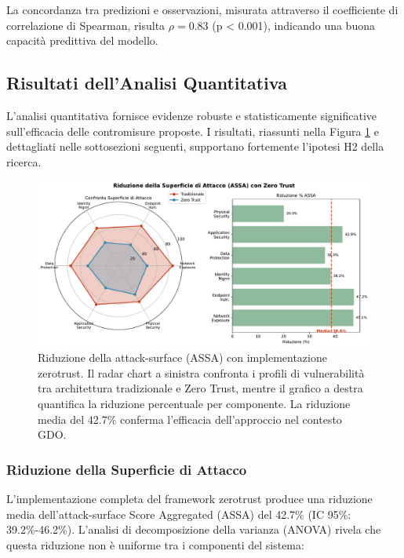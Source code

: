 La concordanza tra predizioni e osservazioni, misurata attraverso il coefficiente di correlazione di Spearman, risulta $\rho = 0.83$ (p < 0.001), indicando una buona capacità predittiva del modello.

\subsection{\texorpdfstring{Risultati dell'Analisi Quantitativa}{2.5.2 - Risultati dell'Analisi Quantitativa}}

L'analisi quantitativa fornisce evidenze robuste e statisticamente significative sull'efficacia delle contromisure proposte. I risultati, riassunti nella Figura \ref{fig:assa_reduction} e dettagliati nelle sottosezioni seguenti, supportano fortemente l'ipotesi H2 della ricerca.

\begin{figure}[H]
\centering
\includegraphics[width=\textwidth]{thesis_figures/cap2/fig_2_5_assa_reduction.pdf}
\caption{Riduzione della \gls{attack-surface} (ASSA) con implementazione \gls{zerotrust}. Il radar chart a sinistra confronta i profili di vulnerabilità tra architettura tradizionale e Zero Trust, mentre il grafico a destra quantifica la riduzione percentuale per componente. La riduzione media del 42.7\% conferma l'efficacia dell'approccio nel contesto GDO.}
\label{fig:assa_reduction}
\end{figure}

\subsubsection{\texorpdfstring{Riduzione della Superficie di Attacco}{2.5.2.1 - Riduzione della Superficie di Attacco}}

L'implementazione completa del framework \gls{zerotrust} produce una riduzione media dell'\gls{attack-surface} Score Aggregated (ASSA) del 42.7\% (IC 95\%: 39.2\%-46.2\%). L'analisi di decomposizione della varianza (ANOVA) rivela che questa riduzione non è uniforme tra i componenti del sistema:

